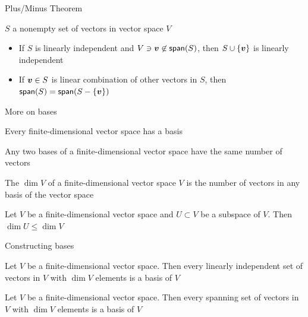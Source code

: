 \documentclass[aspectratio=169]{beamer}\usepackage[]{graphicx}\usepackage[]{xcolor}
\begin{document}
\begin{frame}{Plus/Minus Theorem}
	\begin{theorem}
		$S$ a nonempty set of vectors in vector space $V$
		\begin{itemize}
			\item If $S$ is linearly independent and $V\ni\bm{v}\not\in \mathsf{span}(S)$, then $S\cup\{\bm{v}\}$ is linearly independent
			\item If $\bm{v}\in S$ is linear combination of other vectors in $S$, then $\mathsf{span}(S)=\mathsf{span}(S-\{\bm{v}\})$
		\end{itemize}
	\end{theorem}
\end{frame}


\begin{frame}{More on bases}
	\begin{theorem}
	Every finite-dimensional vector space has a basis
	\end{theorem}
	\vfill
	\begin{importanttheorem}
		Any two bases of a finite-dimensional vector space have the same number of vectors
	\end{importanttheorem}
	\vfill
	\begin{definition}[Dimension]
		The  $\dim V$ of a finite-dimensional vector space $V$ is the number of vectors in any basis of the vector space
	\end{definition}
	\vfill
	\begin{theorem}
		Let $V$ be a finite-dimensional vector space and $U\subset V$ be a subspace of $V$. Then $\dim U\leq \dim V$
	\end{theorem}
\end{frame}


\begin{frame}{Constructing bases}
	\begin{theorem}
		Let $V$ be a finite-dimensional vector space. Then every linearly independent set of vectors in $V$ with $\dim V$ elements is a basis of $V$
	\end{theorem}
	\vfill
	\begin{theorem}
		Let $V$ be a finite-dimensional vector space. Then every spanning set of vectors in $V$ with $\dim V$ elements is a basis of $V$
	\end{theorem}
\end{frame}



\end{document}
